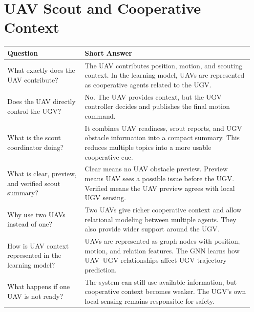 \documentclass[11pt,a4paper]{article}
\begin{document}
\section*{UAV Scout and Cooperative Context}
\begin{longtable}{QA}
\toprule
\textbf{Question} & \textbf{Short Answer} \\
\midrule
\endhead
What exactly does the UAV contribute? &
The UAV contributes position, motion, and scouting context. In the learning model, UAVs are represented as cooperative agents related to the UGV. \\
\addlinespace
Does the UAV directly control the UGV? &
No. The UAV provides context, but the UGV controller decides and publishes the final motion command. \\
\addlinespace
What is the scout coordinator doing? &
It combines UAV readiness, scout reports, and UGV obstacle information into a compact summary. This reduces multiple topics into a more usable cooperative cue. \\
\addlinespace
What is clear, preview, and verified scout summary? &
Clear means no UAV obstacle preview. Preview means UAV sees a possible issue before the UGV. Verified means the UAV preview agrees with local UGV sensing. \\
\addlinespace
Why use two UAVs instead of one? &
Two UAVs give richer cooperative context and allow relational modeling between multiple agents. They also provide wider support around the UGV. \\
\addlinespace
How is UAV context represented in the learning model? &
UAVs are represented as graph nodes with position, motion, and relation features. The GNN learns how UAV--UGV relationships affect UGV trajectory prediction. \\
\addlinespace
What happens if one UAV is not ready? &
The system can still use available information, but cooperative context becomes weaker. The UGV's own local sensing remains responsible for safety. \\
\bottomrule
\end{longtable}
\end{document}
